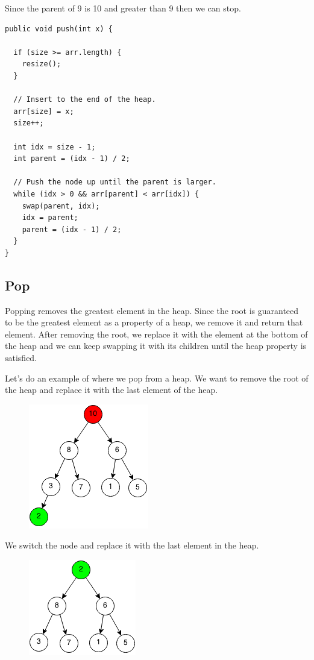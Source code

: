 \documentclass[11pt,oneside]{book}
\makeatletter
\def\maxwidth#1{\ifdim\Gin@nat@width>#1 #1\else\Gin@nat@width\fi}
\makeatother
\begin{document}
Since the parent of 9 is 10 and greater than 9 then we can stop.

\begin{lstlisting}
public void push(int x) {

  if (size >= arr.length) {
    resize();
  }

  // Insert to the end of the heap.
  arr[size] = x;
  size++;

  int idx = size - 1;
  int parent = (idx - 1) / 2;

  // Push the node up until the parent is larger.
  while (idx > 0 && arr[parent] < arr[idx]) {
    swap(parent, idx);
    idx = parent;
    parent = (idx - 1) / 2;
  }
}
\end{lstlisting}

\subsection{Pop}

Popping removes the greatest element in the heap. Since the root is guaranteed to be the greatest element as a property of a heap, we remove it and return that element. After removing the root, we replace it with the element at the bottom of the heap and we can keep swapping it with its children until the heap property is satisfied.

Let's do an example of where we pop from a heap. We want to remove the root of the heap and replace it with the last element of the heap.

\vspace{5px}\begin{figure}[H]\centering
        \includegraphics[width=0.66\maxwidth{\textwidth}]{maxheappop.png}
        \end{figure}

We switch the node and replace it with the last element in the heap.

\vspace{5px}\begin{figure}[H]\centering
        \includegraphics[width=0.66\maxwidth{\textwidth}]{maxheappop1.png}
        \end{figure}
\end{document}
